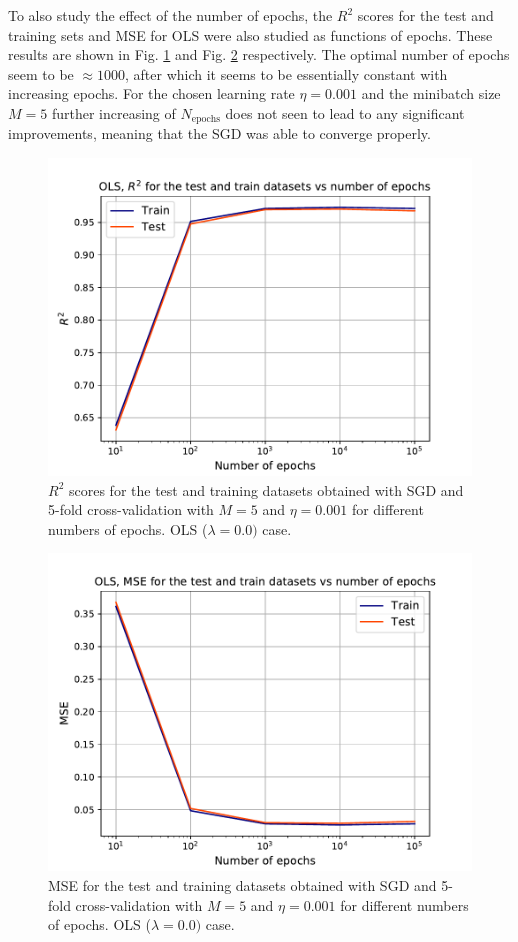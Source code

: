 \documentclass{emulateapj}
\begin{document}
To also study the effect of the number of epochs, the $R^{2}$ scores for the test and training sets and MSE for OLS were also studied as functions of epochs. These results are shown in Fig. \ref{fig: R2_OLS_epochs} and Fig. \ref{fig: MSE_OLS_epochs} respectively. The optimal number of epochs seem to be $\approx 1000$, after which it seems to be essentially constant with increasing epochs. For the chosen learning rate $\eta=0.001$ and the minibatch size $M=5$ further increasing of $N_{\mathrm{epochs}}$ does not seen to lead to any significant improvements, meaning that the SGD was able to converge properly.

\begin{figure}[!htb]
    \centering
    \includegraphics[width=.49\textwidth]{Figures/OLS_R2_epochs.pdf}
    \caption{$R^2$ scores for the test and training datasets obtained with SGD and 5-fold cross-validation with $M=5$ and $\eta=0.001$ for different numbers of epochs. OLS ($\lambda=0.0)$ case.}
    \label{fig: R2_OLS_epochs}
\end{figure}

\begin{figure}[!htb]
    \centering
    \includegraphics[width=.49\textwidth]{Figures/OLS_MSE_epochs.pdf}
    \caption{MSE for the test and training datasets obtained with SGD and 5-fold cross-validation with $M=5$ and $\eta=0.001$ for different numbers of epochs. OLS ($\lambda=0.0)$ case.}
    \label{fig: MSE_OLS_epochs}
\end{figure}
\end{document}
